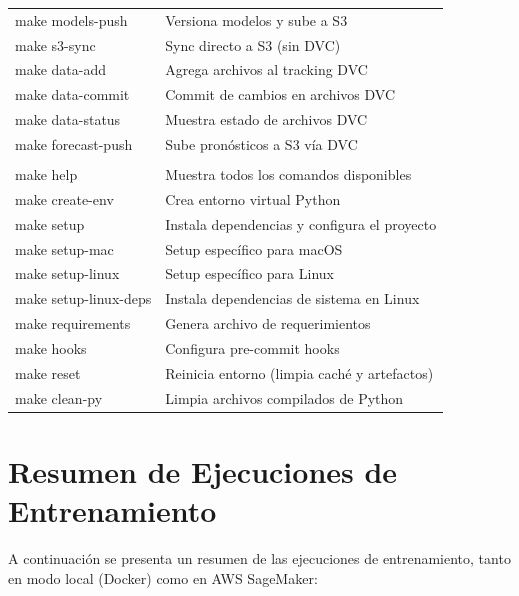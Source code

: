 \documentclass[12pt, letterpaper]{article}
\begin{document}
\begin{longtable}{>{\ttfamily\scriptsize}l >{\raggedright\arraybackslash}p{8cm}}
make models-push & Versiona modelos y sube a S3 \\
make s3-sync & Sync directo a S3 (sin DVC) \\
make data-add & Agrega archivos al tracking DVC \\
make data-commit & Commit de cambios en archivos DVC \\
make data-status & Muestra estado de archivos DVC \\
make forecast-push & Sube pronósticos a S3 vía DVC \\
\midrule
\multicolumn{2}{l}{\textit{Setup e infraestructura}} \\
\midrule
make help & Muestra todos los comandos disponibles \\
make create-env & Crea entorno virtual Python \\
make setup & Instala dependencias y configura el proyecto \\
make setup-mac & Setup específico para macOS \\
make setup-linux & Setup específico para Linux \\
make setup-linux-deps & Instala dependencias de sistema en Linux \\
make requirements & Genera archivo de requerimientos \\
make hooks & Configura pre-commit hooks \\
make reset & Reinicia entorno (limpia caché y artefactos) \\
make clean-py & Limpia archivos compilados de Python \\
\end{longtable}

\section{Resumen de Ejecuciones de Entrenamiento}\label{sec:logs_sagemaker}

A continuación se presenta un resumen de las ejecuciones de entrenamiento, tanto en modo local (Docker) como en AWS SageMaker:
\end{document}
